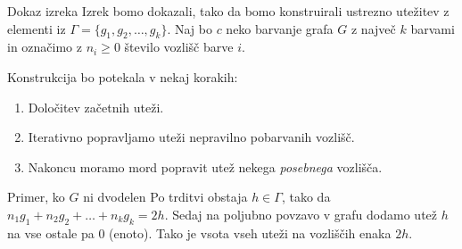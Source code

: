 \documentclass{beamer}
\begin{document}
\begin{frame}{Dokaz izreka}
	Izrek bomo dokazali, tako da bomo konstruirali ustrezno utežitev z elementi iz $\Gamma = \{g_1, g_2, \ldots, g_k\}$. Naj bo $c$ neko barvanje grafa $G$ z največ $k$ barvami in označimo z $n_i \ge 0$ število vozlišč barve $i$.
	
	Konstrukcija bo potekala v nekaj korakih:
	\begin{enumerate}
		\item Določitev začetnih uteži.
		\item Iterativno popravljamo uteži nepravilno pobarvanih vozlišč.
		\item Nakoncu moramo mord popravit utež nekega \textit{posebnega} vozlišča.
	\end{enumerate}
\end{frame}

\begin{frame}{Primer, ko $G$ ni dvodelen}
Po trditvi obstaja $h \in \Gamma$, tako da $n_1g_1 + n_2g_2 + \ldots + n_k g_k = 2h$. Sedaj na poljubno povzavo v grafu dodamo utež $h$ na vse ostale pa $0$ (enoto). Tako je vsota vseh uteži na vozliščih enaka $2h$.
\begin{figure}
\end{figure}
\end{frame}
\end{document}
